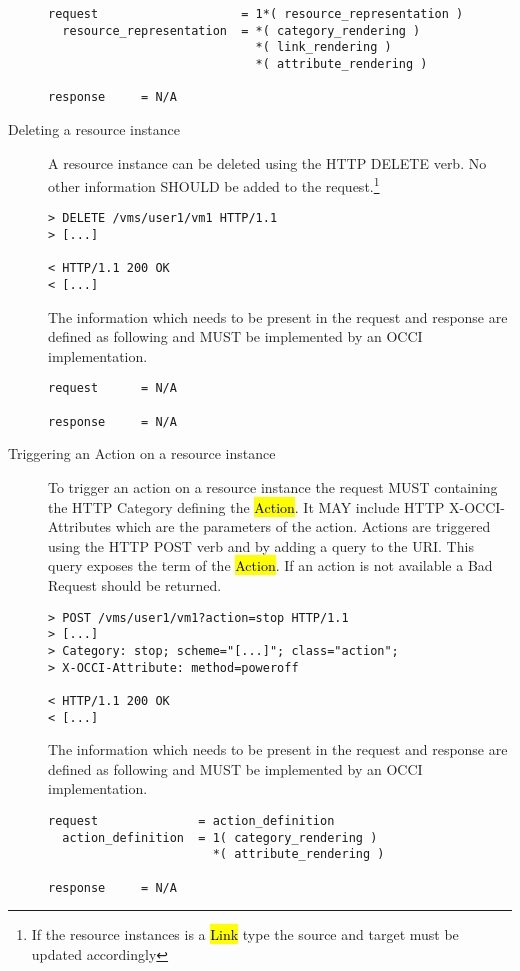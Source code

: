 \documentclass[10pt,a4paper]{article}
\begin{document}
\begin{description}
\begin{verbatim}
request                    = 1*( resource_representation )
  resource_representation  = *( category_rendering )
                             *( link_rendering )
                             *( attribute_rendering )

response     = N/A
\end{verbatim}

  \item[Deleting a resource instance] A resource instance can be
    deleted using the HTTP DELETE verb. No other information SHOULD be
    added to the request.\footnote{If the resource instances is a
      \hl{Link} type the source and target must be updated
      accordingly}

\begin{verbatim}
> DELETE /vms/user1/vm1 HTTP/1.1
> [...]

< HTTP/1.1 200 OK
< [...]
\end{verbatim}

    The information which needs to be present in the request and
    response are defined as following and MUST be implemented by an
    OCCI implementation.

\begin{verbatim}
request      = N/A

response     = N/A
\end{verbatim}

  \item[Triggering an Action on a resource instance] To trigger an
    action on a resource instance the request MUST containing the HTTP
    Category defining the \hl{Action}. It MAY include HTTP
    X-OCCI-Attributes which are the parameters of the action. Actions
    are triggered using the HTTP POST verb and by adding a query to
    the URI. This query exposes the term of the \hl{Action}. If an
    action is not available a Bad Request should be returned.

\begin{verbatim}
> POST /vms/user1/vm1?action=stop HTTP/1.1
> [...]
> Category: stop; scheme="[...]"; class="action";
> X-OCCI-Attribute: method=poweroff

< HTTP/1.1 200 OK
< [...]
\end{verbatim}

    The information which needs to be present in the request and
    response are defined as following and MUST be implemented by an
    OCCI implementation.

\begin{verbatim}
request              = action_definition
  action_definition  = 1( category_rendering )
                       *( attribute_rendering )

response     = N/A
\end{verbatim}

\end{description}
\end{document}

